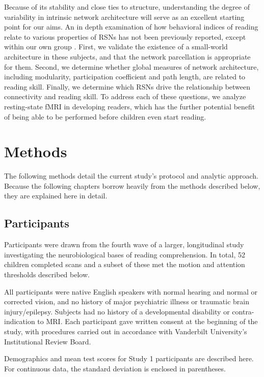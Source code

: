 Because of its stability and close ties to structure, understanding the degree of variability in intrinsic network architecture will serve as an excellent starting point for our aims. An in depth examination of how behavioral indices of reading relate to various properties of RSNs has not been previously reported, except within our own group \citep{Bailey2018}. First, we validate the existence of a small-world architecture in these subjects, and that the network parcellation is appropriate for them. Second, we determine whether global measures of network architecture, including modularity, participation coefficient and path length, are related to reading skill. Finally, we determine which RSNs drive the relationship between connectivity and reading skill. To address each of these questions, we analyze resting-state fMRI in developing readers, which has the further potential benefit of being able to be performed before children even start reading.


\section{Methods}

The following methods detail the current study's protocol and analytic approach. Because the following chapters borrow heavily from the methods described below, they are explained here in detail. 

\subsection{Participants}

Participants were drawn from the fourth wave of a larger, longitudinal study investigating the neurobiological bases of reading comprehension. In total, 52 children completed scans and a subset of these met the motion and attention thresholds described below.

All participants were native English speakers with normal hearing and normal or corrected vision, and no history of major psychiatric illness or traumatic brain injury/epilepsy. Subjects had no history of a developmental disability or contra-indication to MRI.  Each participant gave written consent at the beginning of the study, with procedures carried out in accordance with Vanderbilt University’s Institutional Review Board.

\begin{table}
    \renewcommand{\tabcolsep}{0.09cm}
    \centering
    
    \caption[Participant demographics for Study 1]{Demographics and mean test scores for Study 1 participants are described here. For continuous data, the standard deviation is enclosed in parentheses.}
    \label{table:ch2-participants}
\end{table}


